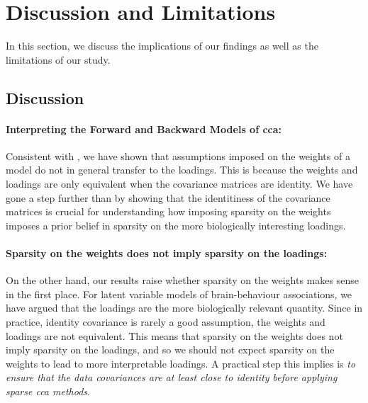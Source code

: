 \section{Discussion and Limitations}

In this section, we discuss the implications of our findings as well as the limitations of our study.

\subsection{Discussion}

\paragraph{Interpreting the Forward and Backward Models of \acrshort{cca}:} Consistent with \cite{haufe2014interpretation}, we have shown that assumptions imposed on the \gls{weights} of a model do not in general transfer to the loadings.
This is because the \gls{weights} and \gls{loadings} are only equivalent when the covariance matrices are identity.
We have gone a step further than \cite{haufe2014interpretation} by showing that the identitiness of the covariance matrices is crucial for understanding how imposing sparsity on the \gls{weights} imposes a prior belief in sparsity on the more biologically interesting loadings.

\paragraph{Sparsity on the \gls{weights} does not imply sparsity on the loadings:}

On the other hand, our results raise whether sparsity on the \gls{weights} makes sense in the first place.
For latent variable models of brain-behaviour associations, we have argued that the \gls{loadings} are the more biologically relevant quantity.
Since in practice, identity covariance is rarely a good assumption, the \gls{weights} and \gls{loadings} are not equivalent.
This means that sparsity on the \gls{weights} does not imply sparsity on the loadings, and so we should not expect sparsity on the \gls{weights} to lead to more interpretable loadings.
A practical step this implies is \textit{to ensure that the data covariances are at least close to identity before applying sparse \acrshort{cca} methods}.

